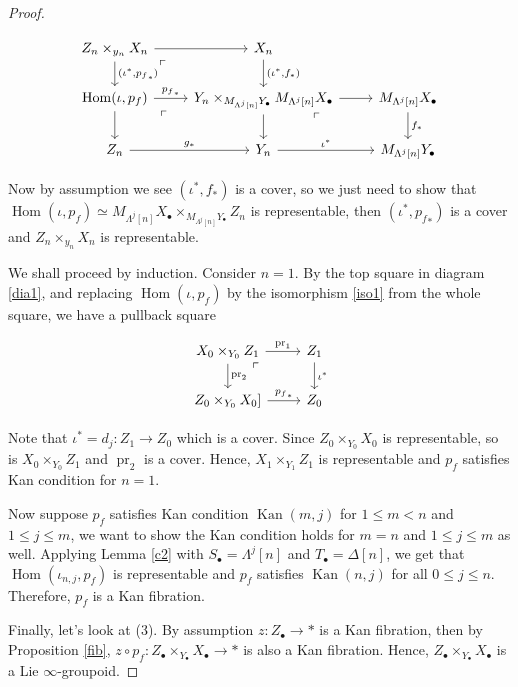 \documentclass[12pt]{amsart}
\theoremstyle{definition}
\theoremstyle{remark}
\numberwithin{equation}{section}
\newcommand{\1}{{\mathbb{1}}}
\newcommand{\bt}{\bullet}
\newcommand{\Hom}{\operatorname{Hom}}
\newcommand{\kan}{\operatorname{Kan}}
\newcommand{\pr}{{\operatorname{pr}}}
\begin{document}
\begin{proof}
        \begin{center}
        \begin{equation}
            \begin{tikzcd}
Z_n\times_{y_n} X_n \arrow[r] \arrow[d, "{(\iota^*, {p_{f}}_*)}"]\arrow[dr, phantom, "\ulcorner", very near start] & {X_n} \arrow[d, "{(\iota^* , f_*)}"]           &              \\
{\Hom(\iota, p_f)} \arrow[r, "{p_{f}}_*"] \arrow[d]\arrow[dr, phantom, "\ulcorner", very near start] & {Y_n \times_{M_{\Lambda^j[n]}Y_{\bt}} M_{\Lambda^j[n]}X_{\bt}}       \arrow[d] \arrow[r]\arrow[dr, phantom, "\ulcorner", very near start] & {M_{\Lambda^j[n]}X_{\bt}} \arrow[d, "f_*"] \\
{Z_n} \arrow[r, "g_*"]           & {Y_n} \arrow[r, "\iota^*"]           & {M_{\Lambda^j[n]}Y_{\bt}}          
\end{tikzcd}
 \end{equation}
        \end{center}
       
    Now by assumption we see $(\iota^* , f_*)$ is a cover, so we just need to show that $\Hom(\iota, p_f) \simeq {M_{\Lambda^j[n]}X_{\bt}}\times_{M_{\Lambda^j[n]}Y_{\bt}} Z_n$ is representable, then $(\iota^*, {p_{f}}_*)$ is a cover and $Z_n\times_{y_n} X_n$ is representable. 
    
    We shall proceed by induction. Consider $n = 1$. By the top square in diagram \ref{dia1}, and replacing $\Hom(\iota, p_f)$ by the isomorphism \ref{iso1} from the whole square, we have a pullback square
    \begin{center}
            \begin{equation}
                \begin{tikzcd}
    X_0\times_{Y_0} Z_1 \arrow[r, "\pr_1"] \arrow[d, "\pr_2"] \arrow[dr, phantom, "\ulcorner", very near start]& Z_1 \arrow[d, "\iota^*"]  \\
    Z_{0} \times_{Y_0} X_{0} \arrow[r, "{p_f}_*"] ]& Z_{0}
    \end{tikzcd}
    \end{equation}
            \end{center}
    Note that $\iota^* = d_j: Z_1\to Z_0$ which is a cover. Since $ Z_{0} \times_{Y_0} X_{0} $ is representable, so is $X_0\times_{Y_0} Z_1 $ and $\pr_2$ is a cover. Hence, $X_1\times_{Y_1} Z_1$ is representable and $p_f$ satisfies Kan condition for $n=1.$
    
    Now suppose $p_f$ satisfies Kan condition $\kan(m, j)$ for $1\le m < n$ and $1 \le j \le m$, we want to show the Kan condition holds for $m=n$ and $1 \le j \le m$ as well. Applying Lemma \ref{c2} with $S_{\bt} = \Lambda^j[n]$ and $T_{\bt} = \Delta[n]$, we get that $\Hom(\iota_{n,j}, p_f)$ is representable and $p_f$ satisfies $\kan(n,j)$ for all $0\le j \le n$. Therefore, $p_f$ is a Kan fibration. 
    
    Finally, let's look at (3). By assumption $z:Z_{\bt}\to *$ is a Kan fibration, then by Proposition \ref{fib}, $z\circ p_f: Z_{\bt}\times_{Y_{\bt}} X_{\bt}\to *$ is also a Kan fibration. Hence, $Z_{\bt}\times_{Y_{\bt}} X_{\bt}$ is a Lie $\infty$-groupoid.
    \end{proof} 
\end{document}
